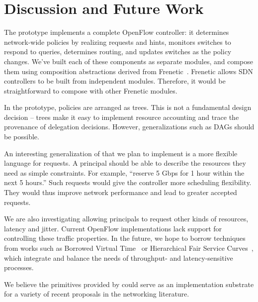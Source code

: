 \chapter{Discussion and Future Work}
\label{sec:discussion}



The \sys prototype implements a complete OpenFlow controller: it
determines network-wide policies by realizing requests and hints,
monitors switches to respond to queries, determines routing, and
updates switches as the policy changes. We've built each of
these components as separate modules, and compose them using
composition abstractions derived from
Frenetic~\cite{Foster:2010}. Frenetic allows SDN controllers to be
built from independent modules. Therefore, it would be straightforward
to compose \sys with other Frenetic modules.


In the \sys prototype, policies are arranged as trees. This is
not a fundamental design decision -- trees make it easy to implement
resource accounting and trace the provenance of delegation decisions. However,
generalizations such as DAGs should be possible.

An interesting generalization of \sys that we plan to implement is a
more flexible language for requests. A principal should be able to
describe the resources they need as simple constraints. For example,
``reserve 5 Gbps for 1 hour within the next 5 hours.'' Such requests
would give the \sys controller more scheduling flexibility. They would
thus improve network performance and lead to greater accepted requests.


We are also investigating allowing principals to request other kinds
of resources, \eg latency and jitter. Current OpenFlow implementations
lack support for controlling these traffic properties. In the
future, we hope to borrow techniques from works such as Borrowed
Virtual Time~\cite{BVT} or Hierarchical Fair Service
Curves~\cite{Stoica:1997}, which integrate and balance the needs of
throughput- and latency-sensitive processes.

 We believe the primitives
provided by \sys could serve as an implementation substrate for a
variety of recent proposals in the networking literature.

